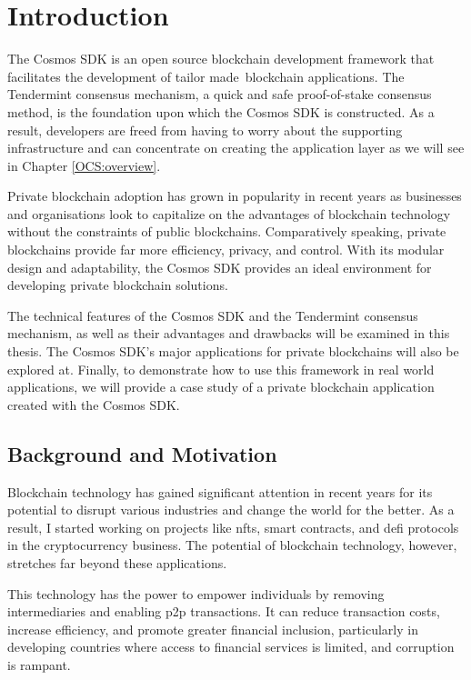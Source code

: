 \chapter{Introduction}
\label{ch:introduccion}

The Cosmos SDK is an open source blockchain development framework that facilitates the development of tailor made blockchain applications. The Tendermint consensus mechanism, a quick and safe proof-of-stake consensus method, is the foundation upon which the Cosmos SDK is constructed. As a result, developers are freed from having to worry about the supporting infrastructure and can concentrate on creating the application layer as we will see in Chapter \ref{OCS:overview}.

Private blockchain adoption has grown in popularity in recent years as businesses and organisations look to capitalize on the advantages of blockchain technology without the constraints of public blockchains. Comparatively speaking, private blockchains provide far more efficiency, privacy, and control. With its modular design and adaptability, the Cosmos SDK provides an ideal environment for developing private blockchain solutions.

The technical features of the Cosmos SDK and the Tendermint consensus mechanism, as well as their advantages and drawbacks will be examined in this thesis. The Cosmos SDK's major applications for private blockchains will also be explored at. Finally, to demonstrate how to use this framework in real world applications, we will provide a case study of a private blockchain application created with the Cosmos SDK.

\section{Background and Motivation}

Blockchain technology has gained significant attention in recent years for its potential to disrupt various industries and change the world for the better. As a result, I started working on projects like \glspl{nft}, smart contracts, and \gls{defi} protocols in the cryptocurrency business. The potential of blockchain technology, however, stretches far beyond these applications.

This technology has the power to empower individuals by removing intermediaries and enabling \gls{p2p} transactions. It can reduce transaction costs, increase efficiency, and promote greater financial inclusion, particularly in developing countries where access to financial services is limited, and corruption is rampant.

